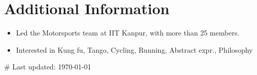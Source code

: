 \documentclass[letterpaper]{twentysecondcv} %
\begin{document}

\section{Additional Information}

\begin{itemize}%
	\item Led the Motorsports team at IIT Kanpur, with more than 25 members.
	\item Interested in
	Kung fu, Tango, Cycling, Running, Abstract expr., Philosophy


\end{itemize}

\begin{footnotesize}
\begin{flushright}\# Last updated: \today \end{flushright}
\end{footnotesize}





\end{document}
